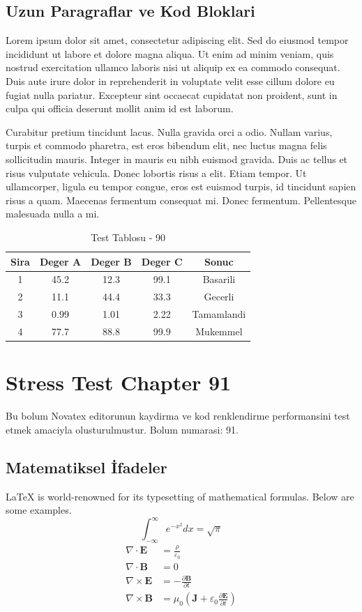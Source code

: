 \documentclass[12pt,a4paper]{article}
\begin{document}
\subsection{Uzun Paragraflar ve Kod Bloklari}
Lorem ipsum dolor sit amet, consectetur adipiscing elit. Sed do eiusmod tempor incididunt ut labore et dolore magna aliqua. Ut enim ad minim veniam, quis nostrud exercitation ullamco laboris nisi ut aliquip ex ea commodo consequat. Duis aute irure dolor in reprehenderit in voluptate velit esse cillum dolore eu fugiat nulla pariatur. Excepteur sint occaecat cupidatat non proident, sunt in culpa qui officia deserunt mollit anim id est laborum.

Curabitur pretium tincidunt lacus. Nulla gravida orci a odio. Nullam varius, turpis et commodo pharetra, est eros bibendum elit, nec luctus magna felis sollicitudin mauris. Integer in mauris eu nibh euismod gravida. Duis ac tellus et risus vulputate vehicula. Donec lobortis risus a elit. Etiam tempor. Ut ullamcorper, ligula eu tempor congue, eros est euismod turpis, id tincidunt sapien risus a quam. Maecenas fermentum consequat mi. Donec fermentum. Pellentesque malesuada nulla a mi.

\begin{table}[h!]
\centering
\begin{tabular}{|c|c|c|c|c|}
\hline
\textbf{Sira} & \textbf{Deger A} & \textbf{Deger B} & \textbf{Deger C} & \textbf{Sonuc} \\
\hline
1 & 45.2 & 12.3 & 99.1 & Basarili \\
2 & 11.1 & 44.4 & 33.3 & Gecerli \\
3 & 0.99 & 1.01 & 2.22 & Tamamlandi \\
4 & 77.7 & 88.8 & 99.9 & Mukemmel \\
\hline
\end{tabular}
\caption{Test Tablosu - 90}
\end{table}

\newpage
\section{Stress Test Chapter 91}
Bu bolum Novatex editorunun kaydirma ve kod renklendirme performansini test etmek amaciyla olusturulmustur. Bolum numarasi: 91.

\subsection{Matematiksel İfadeler}
\LaTeX{} is world-renowned for its typesetting of mathematical formulas. Below are some examples.
\begin{equation}
\int_{-\infty}^{\infty} e^{-x^2} dx = \sqrt{\pi}
\end{equation}
\begin{align}
\nabla \cdot \mathbf{E} &= \frac{\rho}{\varepsilon_0} \\
\nabla \cdot \mathbf{B} &= 0 \\
\nabla \times \mathbf{E} &= -\frac{\partial \mathbf{B}}{\partial t} \\
\nabla \times \mathbf{B} &= \mu_0\left(\mathbf{J} + \varepsilon_0 \frac{\partial \mathbf{E}}{\partial t}\right)
\end{align}
\end{document}
